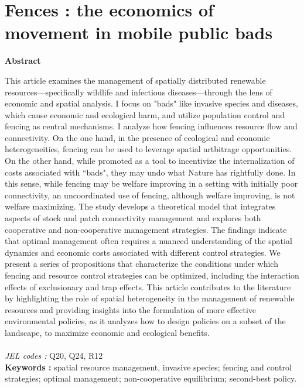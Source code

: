 \chapter{Fences : the economics of movement in mobile public bads}
\label{chapter3}

\begin{center}

\textbf{Abstract}\par
    \vspace*{.2cm}
    \noindent
    \begin{minipage}{0.9\textwidth}
    \singlespacing
This article examines the management of spatially distributed renewable resources—specifically wildlife and infectious diseases—through the lens of economic and spatial analysis. I focus on "bads" like invasive species and diseases, which cause economic and ecological harm, and utilize population control and fencing as central  mechanisms. I analyze how fencing influences resource flow and connectivity. On the one hand, in the presence of ecological and economic heterogeneities, fencing can be used to leverage spatial artbitrage opportunities. On the other hand, while promoted as a tool to incentivize the internalization of costs associated with ``bads", they may undo what Nature has rightfully done. In this sense, while fencing may be welfare improving in a setting with initially poor connectivity, an uncoordinated use of fencing, although welfare improving, is not welfare maximizing. The study develops a theoretical model that integrates aspects of stock and patch connectivity management and explores both cooperative and non-cooperative management strategies. The findings indicate that optimal management often requires a nuanced understanding of the spatial dynamics and economic costs associated with different control strategies. We present a series of propositions that characterize the conditions under which fencing and resource control strategies can be optimized, including the interaction effects of exclusionary and trap effects. This article contributes to the literature by highlighting the role of spatial heterogeneity in the management of renewable resources and providing insights into the formulation of more effective environmental policies, as it analyzes how to design policies on a subset of the landscape, to maximize economic and ecological benefits. \\\\
\textit{JEL codes :} Q20, Q24, R12\\
\textbf{Keywords :} spatial resource management, invasive species; fencing and control strategies; optimal management; non-cooperative equilibrium; second-best policy. 
\end{minipage}
\end{center}
    \vfill


